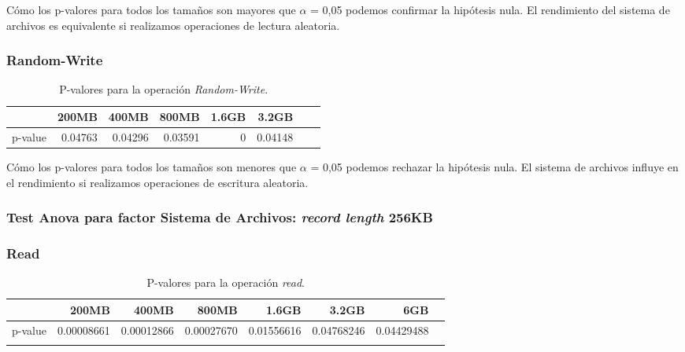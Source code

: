 Cómo los p-valores para todos los tamaños son mayores que $\alpha$ = 0,05 podemos confirmar la hipótesis nula. El rendimiento del sistema de archivos es equivalente si realizamos operaciones de lectura aleatoria. 

\subsubsection{Random-Write}
\begin{table}[!htp]\centering
\scriptsize
\begin{tabular}{lrrrrrrr}\toprule
&200MB &400MB &800MB &1.6GB &3.2GB \\\midrule
p-value &0.04763 &0.04296 &0.03591 &0 &0.04148 \\
\bottomrule
\end{tabular}
\caption{P-valores para la operación \textit{Random-Write}.}\label{tab: }
\end{table}

Cómo los p-valores para todos los tamaños son menores que $\alpha$ = 0,05 podemos rechazar la hipótesis nula. El sistema de archivos influye en el rendimiento si realizamos operaciones de escritura aleatoria. 














\subsubsection{Test Anova para factor Sistema de Archivos: \textit{record length} 256KB}

\subsubsection{Read}
\begin{table}[!htp]\centering
\scriptsize
\begin{tabular}{lrrrrrrr}\toprule
&200MB &400MB &800MB &1.6GB &3.2GB &6GB \\\midrule
p-value &0.00008661 &0.00012866 &0.00027670 &0.01556616 &0.04768246 &0.04429488 \\ \\
\bottomrule
\end{tabular}
\caption{P-valores para la operación \textit{read}.}\label{tab: }
\end{table}

